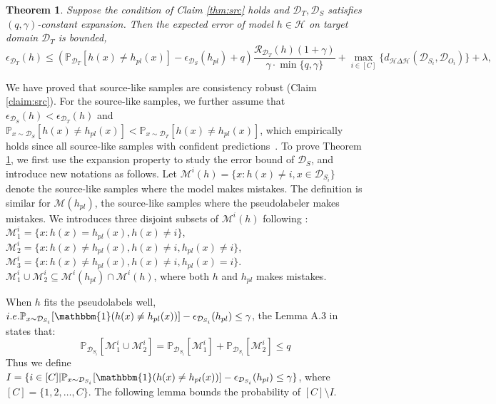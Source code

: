 \documentclass{article}
\newtheorem{theorem}{Theorem}[section]
\begin{document}
\begin{theorem}\label{thm:main1} Suppose the condition of Claim \ref{thm:src} holds and $\mathcal{D}_T,\mathcal{D}_S$ satisfies $(q,\gamma)$-constant expansion. Then the expected error of model $h\in \mathcal{H}$ on target domain $\mathcal{D}_T$ is bounded,
\begin{equation}\label{eq:main}
    \epsilon_{\mathcal{D}_T}(h) \leq  
\left(
  \mathbb{P}_{\mathcal{D}_T}[h(x) \neq h_{pl}(x)] 
 - \epsilon_{\mathcal{D}_S}(h_{pl}) + q
\right)
\frac{\mathcal{R}_{\mathcal{D}_T}(h)(1+\gamma)}{\gamma \cdot \min{\{q,\gamma\}}} + \max_{i \in [C]}\{d_{\mathcal{H}\Delta\mathcal{H}}(\mathcal{D}_{S_i},\mathcal{D}_{O_i})\}+\lambda, 
\end{equation}

\end{theorem}

We have proved that source-like samples are consistency robust (Claim \ref{claim:src}). For the source-like samples, we further assume that $\epsilon_{\mathcal{D}_S}(h)<\epsilon_{\mathcal{D}_T}(h)$ and $\mathbb{P}_{x\sim \mathcal{D}_S}[h(x)\neq h_{pl}(x)]<\mathbb{P}_{x\sim \mathcal{D}_T}[h(x)\neq h_{pl}(x)]$, which empirically holds since all source-like samples with confident predictions~\cite{kim2020PrDA}. To prove Theorem \ref{thm:main1}, we first use the expansion property to study the error bound of $\mathcal{D}_S$, and introduce new notations as follows. Let $\mathcal{M}^i(h) = \{x: h(x)\neq i, x\in \mathcal{D}_{S_i}\}$ denote the source-like samples where the model makes mistakes. The definition is similar for $\mathcal{M}(h_{pl})$, the source-like samples where the pseudolabeler makes mistakes. We introduces three disjoint subsets of $\mathcal{M}^i(h)$ following \cite{ICLR_2021_theory_wei}: $\mathcal{M}_1^i=\{x: h(x)=h_{pl}(x), h(x)\neq i\}$, $\mathcal{M}_2^i=\{x: h(x)\neq h_{pl}(x), h(x)\neq i, h_{pl}(x)\neq i \}$, $\mathcal{M}_3^i=\{x: h(x)\neq h_{pl}(x), h(x)\neq i, h_{pl}(x)=i\}$. $\mathcal{M}_1^i \cup \mathcal{M}_2^i \subseteq \mathcal{M}^i(h_{pl})\cap \mathcal{M}^i(h)$, where both $h$ and $h_{pl}$ makes mistakes. 

When $h$ fits the pseudolabels well, $i.e. \mathbb{P}_{x\sim \mathcal{D}_{S_i}}[\mathbbm{1}(h(x)\neq h_{pl}(x))]-\epsilon_{\mathcal{D}_{S_i}}(h_{pl})\leq \gamma$, the Lemma A.3 in \cite{ICLR_2021_theory_wei} states that:
\begin{equation}\label{lemma:src0}
    \mathbb{P}_{\mathcal{D}_{S_i}}[\mathcal{M}_1^i \cup \mathcal{M}_2^i] =\mathbb{P}_{\mathcal{D}_{S_i}}[\mathcal{M}_1^i] + \mathbb{P}_{\mathcal{D}_{S_i}}  [\mathcal{M}_2^i] \leq q
\end{equation}
Thus we define $I= \{i\in [C]|\mathbb{P}_{x\sim \mathcal{D}_{S_i}}[\mathbbm{1}(h(x)\neq h_{pl}(x))]-\epsilon_{\mathcal{D}_{S_i}}(h_{pl})\leq \gamma \}$, where $[C] = \{1,2,\dots,C\}$. The following lemma bounds the probability of ${[C] \setminus I}$.
\end{document}
